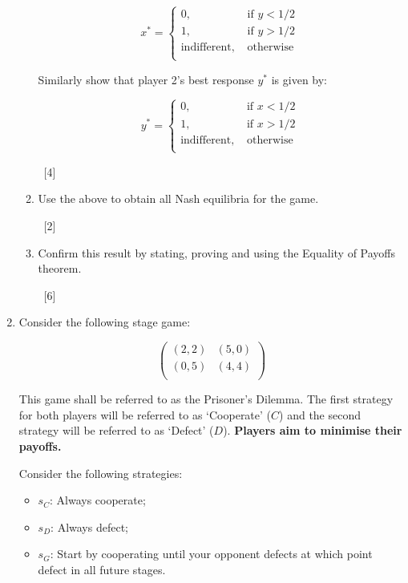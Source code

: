 \documentclass[12pt,a4paper]{article}
\begin{document}
\begin{enumerate}
\begin{enumerate}
            \[
            x^*=\begin{cases}
                0,&\text{ if } y < 1/2\\
                1,&\text{ if } y > 1/2\\
                \text{indifferent},&\text{ otherwise }\\
            \end{cases}
            \]

            Similarly show that player 2's best response $y^*$ is given by:

            \[
            y^*=\begin{cases}
                0,&\text{ if } x < 1/2\\
                1,&\text{ if } x > 1/2\\
                \text{indifferent},&\text{ otherwise }\\
            \end{cases}
            \]

        ~\hfill{[4]}

        \item Use the above to obtain all Nash equilibria for the game.

        ~\hfill{[2]}

        \item Confirm this result by stating, proving and using the Equality of Payoffs theorem.

        ~\hfill{[6]}

    \end{enumerate}

\newpage
\item

        Consider the following stage game:

        \[
        \begin{pmatrix}
        (2,2) & (5,0)\\
        (0,5) & (4,4)\\
        \end{pmatrix}
        \]

        This game shall be referred to as the Prisoner's Dilemma. The first strategy for both players will be referred to as `Cooperate' (\(C\)) and the second strategy will be referred to as `Defect' (\(D\)). \textbf{Players aim to minimise their payoffs.}

        Consider the following strategies:

            \begin{itemize}
                \item \(s_C\): Always cooperate;
                \item \(s_D\): Always defect;
                \item \(s_G\): Start by cooperating until your opponent defects at which point defect in all future stages.
            \end{itemize}


\end{enumerate}
\end{document}
